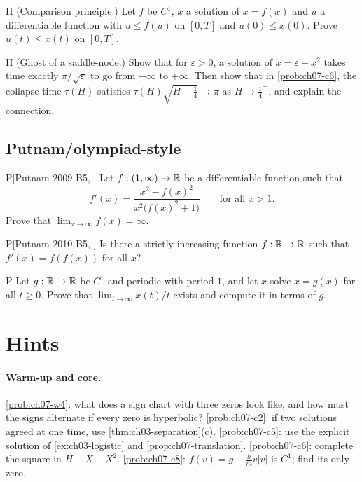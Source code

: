 \begin{problem}{H}\label{prob:ch07-h4}
(Comparison principle.) Let $f$ be $C^1$, $x$ a solution of $\dot x = f(x)$ and
$u$ a differentiable function with $\dot u\le f(u)$ on $[0,T]$ and
$u(0)\le x(0)$. Prove $u(t)\le x(t)$ on $[0,T]$.
\end{problem}

\begin{problem}{H}\label{prob:ch07-h5}
(Ghost of a saddle-node.) Show that for $\varepsilon>0$, a solution of
$\dot x = \varepsilon + x^2$ takes time exactly $\pi/\sqrt\varepsilon$ to go from
$-\infty$ to $+\infty$. Then show that in \cref{prob:ch07-c6}, the collapse time
$\tau(H)$ satisfies $\tau(H)\sqrt{H - \tfrac14}\to\pi$ as $H\to\frac14^+$, and
explain the connection.
\end{problem}

\subsection*{Putnam/olympiad-style}

\begin{problem}{P}[Putnam 2009 B5, \cite{Putnam2009}]\label{prob:ch07-p1}
Let $f:(1,\infty)\to\mathbb{R}$ be a differentiable function such that
\[
  f'(x) = \frac{x^2 - f(x)^2}{x^2\bigl(f(x)^2 + 1\bigr)}\qquad\text{for all } x>1.
\]
Prove that $\displaystyle\lim_{x\to\infty}f(x) = \infty$.
\end{problem}

\begin{problem}{P}[Putnam 2010 B5, \cite{Putnam2010}]\label{prob:ch07-p2}
Is there a strictly increasing function $f:\mathbb{R}\to\mathbb{R}$ such that
$f'(x) = f(f(x))$ for all $x$?
\end{problem}

\begin{problem}{P}\label{prob:ch07-p3}
Let $g:\mathbb{R}\to\mathbb{R}$ be $C^1$ and periodic with period $1$, and let $x$ solve
$\dot x = g(x)$ for all $t\ge0$. Prove that $\lim_{t\to\infty}x(t)/t$ exists and
compute it in terms of $g$.
\end{problem}

\section{Hints}\label{sec:ch07-hints}

\paragraph{Warm-up and core.}
\cref{prob:ch07-w4}: what does a sign chart with three zeros look like, and how
must the signs alternate if every zero is hyperbolic?
\cref{prob:ch07-c2}: if two solutions agreed at one time, use
\cref{thm:ch03-separation}(c).
\cref{prob:ch07-c5}: use the explicit solution of \cref{ex:ch03-logistic} and
\cref{prop:ch07-translation}.
\cref{prob:ch07-c6}: complete the square in $H - X + X^2$.
\cref{prob:ch07-c8}: $f(v) = g - \frac kmv|v|$ is $C^1$; find its only zero.

